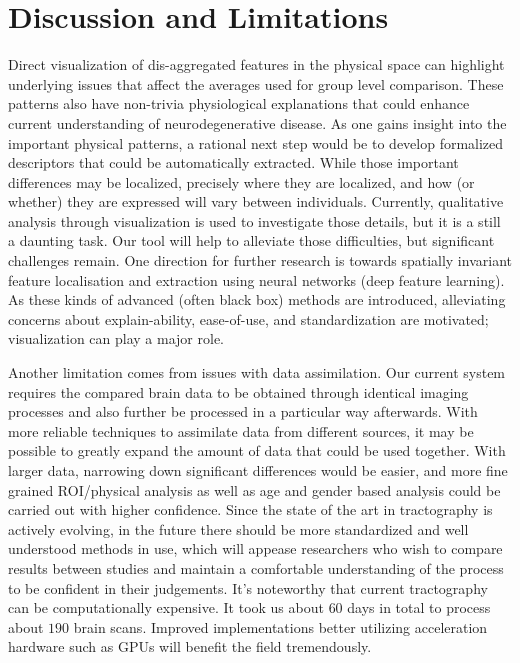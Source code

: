 \section{Discussion and Limitations}

\noindent Direct visualization of dis-aggregated features in the physical space can highlight underlying issues that affect the averages used for group level comparison. These patterns also have non-trivia physiological explanations that could enhance current understanding of neurodegenerative disease. As one gains insight into the important physical patterns, a rational next step would be to develop formalized descriptors that could be automatically extracted. While those important differences may be localized, precisely where they are localized, and how (or whether) they are expressed will vary between individuals. Currently, qualitative analysis through visualization is used to investigate those details, but it is a still a daunting task. Our tool will help to alleviate those difficulties, but significant challenges remain. One direction for further research is towards spatially invariant feature localisation and extraction using  neural networks (deep feature learning). As these kinds of advanced (often black box) methods are introduced, alleviating concerns about explain-ability, ease-of-use, and standardization are motivated; visualization can play a major role.

Another limitation comes from issues with data assimilation. Our current system requires the compared brain data to be obtained through identical imaging processes and also further be processed in a particular way afterwards. With more reliable techniques to assimilate data from different sources, it may be possible to greatly expand the amount of data that could be used together. With larger data, narrowing down significant differences would be easier, and more fine grained ROI/physical analysis as well as age and gender based analysis could be carried out with higher confidence. Since the state of the art in tractography is actively evolving, in the future there should be more standardized and well understood methods in use, which will appease researchers who wish to compare results between studies and maintain a comfortable understanding of the process to be confident in their judgements. 
It's noteworthy that 
current tractography can be computationally expensive. It took us about $60$ days in total to process about $190$ brain scans. Improved implementations better utilizing acceleration hardware such as GPUs will benefit the field tremendously. 


